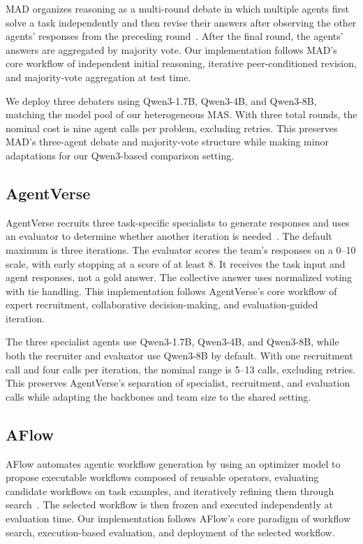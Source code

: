 MAD organizes reasoning as a multi-round debate in which multiple agents first solve a task independently and then revise their answers after observing the other agents' responses from the preceding round~\citep{du2024debate}. After the final round, the agents' answers are aggregated by majority vote. Our implementation follows MAD's core workflow of independent initial reasoning, iterative peer-conditioned revision, and majority-vote aggregation at test time.

We deploy three debaters using Qwen3-1.7B, Qwen3-4B, and Qwen3-8B, matching the model pool of our heterogeneous MAS. With three total rounds, the nominal cost is nine agent calls per problem, excluding retries. This preserves MAD's three-agent debate and majority-vote structure while making minor adaptations for our Qwen3-based comparison setting.

\subsection{AgentVerse}

AgentVerse recruits three task-specific specialists to generate responses and uses an evaluator to determine whether another iteration is needed~\citep{chen2024agentverse}. The default maximum is three iterations. The evaluator scores the team's responses on a 0--10 scale, with early stopping at a score of at least 8. It receives the task input and agent responses, not a gold answer. The collective answer uses normalized voting with tie handling. This implementation follows AgentVerse's core workflow of expert recruitment, collaborative decision-making, and evaluation-guided iteration.

The three specialist agents use Qwen3-1.7B, Qwen3-4B, and Qwen3-8B, while both the recruiter and evaluator use Qwen3-8B by default. With one recruitment call and four calls per iteration, the nominal range is 5--13 calls, excluding retries. This preserves AgentVerse's separation of specialist, recruitment, and evaluation calls while adapting the backbones and team size to the shared setting.

\subsection{AFlow}

AFlow automates agentic workflow generation by using an optimizer model to propose executable workflows composed of reusable operators, evaluating candidate workflows on task examples, and iteratively refining them through search~\citep{zhang2025aflow}. The selected workflow is then frozen and executed independently at evaluation time. Our implementation follows AFlow's core paradigm of workflow search, execution-based evaluation, and deployment of the selected workflow.

